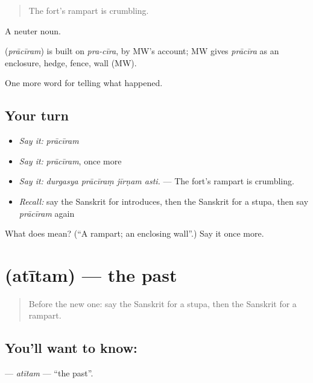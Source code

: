 \begin{quote}
The fort's rampart is crumbling.
\end{quote}

A neuter noun.

\begin{cousinweb}
\textbf{} (\emph{prācīram}) is built on \emph{pra-cīra}, by MW's account; MW gives \emph{prācīra} as an enclosure, hedge, fence, wall (MW).
\end{cousinweb}

\begin{grammarlens}[title={What you've built}]
One more word for telling what happened.
\end{grammarlens}

\subsection*{Your turn}
\begin{itemize}
\raggedright
  \item \emph{Say it:} \emph{prācīram}
  \item \emph{Say it:} \emph{prācīram}, once more
  \item \emph{Say it:} \emph{durgasya prācīraṃ jīrṇam asti.} — The fort's rampart is crumbling.
  \item \emph{Recall:} say the Sanskrit for introduces, then the Sanskrit for a stupa, then say \emph{prācīram} again
\end{itemize}

\begin{tcolorbox}[breakable,colback=teal!4,colframe=teal!35!black,title={Before you move on}]
What does  mean? (\textquotedblleft{}A rampart; an enclosing wall\textquotedblright{}.) Say it once more.
\end{tcolorbox}
\section[\texorpdfstring{\sk{अतीतम्} (atītam)}{अतीतम् (atītam)}]{ (atītam) — the past}

\label{lesson:SA-C323-atitam}



\begin{quote}
Before the new one: say the Sanskrit for a stupa, then the Sanskrit for a rampart.
\end{quote}

\subsection*{You'll want to know: }
\textbf{} — \emph{atītam} — \textquotedblleft{}the past\textquotedblright{}.

